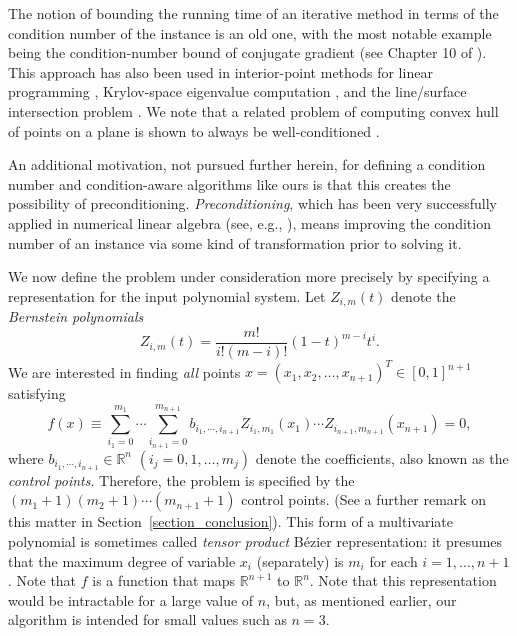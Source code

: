 \documentclass{article}
\begin{document}
The notion of bounding the running time of an iterative method in
terms of the condition number of the instance is an old one, with
the most notable example being the condition-number bound of
conjugate gradient (see Chapter 10 of \cite{gvl}). This approach
has also been used in interior-point methods for linear
programming \cite{freund}, Krylov-space eigenvalue computation
\cite{toh}, and the line/surface intersection problem
\cite{srijuntongsiri_lsi}.  We note that a related problem of computing convex hull of points on a plane is shown to always be well-conditioned \cite{jiang}.

An additional motivation, not pursued further herein, for defining a
condition number and condition-aware algorithms like ours is that this
creates the possibility of preconditioning.  {\em Preconditioning},
which has been very successfully applied in numerical linear algebra
(see, e.g., \cite{TrefethenBau}), means improving the condition number
of an instance via some kind of transformation prior to solving it.

We now define the problem under consideration more precisely by
specifying a representation for the input polynomial system.
Let $Z_{i,m}(t)$ denote the \emph{Bernstein polynomials}
\[
Z_{i,m}(t) = \frac{m!}{i!(m-i)!}(1-t)^{m-i}t^i.
\]
We are interested in finding \emph{all} points $x=\left(x_1,x_2,\ldots,x_{n+1}\right)^T \in [0,1]^{n+1}$ satisfying
\begin{equation}
\label{maineq}
f(x) \equiv \sum_{i_1 = 0}^{m_1}\cdots \sum_{i_{n+1}=0}^{m_{n+1}} b_{i_1,  \cdots, i_{n+1}} Z_{i_1,m_1}(x_1) \cdots Z_{i_{n+1},m_{n+1}}(x_{n+1}) = 0,
\end{equation}
where $b_{i_1, \cdots, i_{n+1}} \in \mathbb{R}^n$ $(i_j = 0, 1, \ldots, m_j)$ denote the coefficients, also known as the \emph{control points}.  Therefore, the
problem is specified by the $(m_1+1)(m_2+1)\cdots (m_{n+1}+1)$ control points.  
(See a further remark on this matter in Section~\ref{section_conclusion}).
This form of a multivariate polynomial is sometimes called {\em tensor product} B\'ezier
representation: it presumes 
that the maximum degree of variable $x_i$ (separately) is $m_i$
for each $i=1,\ldots,n+1$.  
Note that $f$ is a function that maps $\mathbb{R}^{n+1}$ to $\mathbb{R}^n$.  
Note that this representation would be intractable
for a large value of $n$, but, as mentioned earlier, our algorithm is
intended for small values such as $n=3$.
\end{document}
